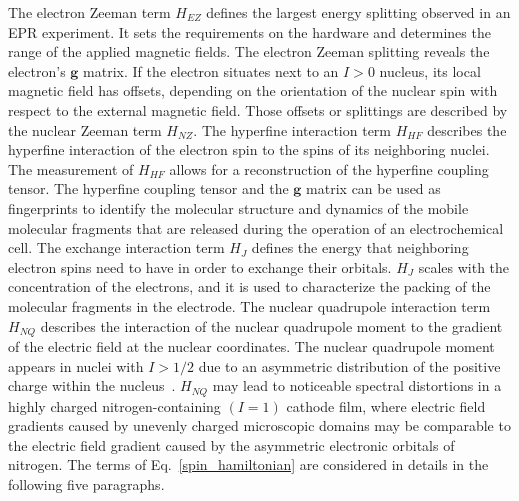 The electron Zeeman term $H_{EZ}$ defines the largest energy splitting observed in an EPR experiment. It sets the requirements on the hardware and determines the range of the applied magnetic fields. The electron Zeeman splitting reveals the electron's $\textbf{g}$ matrix. If the electron situates next to an $I>0$ nucleus, its local magnetic field has offsets, depending on the orientation of the nuclear spin with respect to the external magnetic field. Those offsets or splittings are described by the nuclear Zeeman term $H_{NZ}$. The hyperfine interaction term $H_{HF}$ describes the hyperfine interaction of the electron spin to the spins of its neighboring nuclei. The measurement of $H_{HF}$ allows for a reconstruction of the hyperfine coupling tensor. The hyperfine coupling tensor and the $\textbf{g}$ matrix can be used as fingerprints to identify the molecular structure and dynamics of the mobile molecular fragments that are released during the operation of an electrochemical cell. The exchange interaction term $H_{J}$ defines the energy that neighboring electron spins need to have in order to exchange their orbitals. $H_{J}$ scales with the concentration of the electrons, and it is used to characterize the packing of the molecular fragments in the electrode. The nuclear quadrupole interaction term $H_{NQ}$ describes the interaction of the nuclear quadrupole moment to the gradient of the electric field at the nuclear coordinates. The nuclear quadrupole moment appears in nuclei with $I>1/2$ due to an asymmetric distribution of the positive charge within the nucleus~\cite{Schweiger2001}. $H_{NQ}$ may lead to noticeable spectral distortions in a highly charged nitrogen-containing $(I=1)$ cathode film, where electric field gradients caused by unevenly charged microscopic domains may be comparable to the electric field gradient caused by the asymmetric electronic orbitals of nitrogen. The terms of Eq.~\ref{spin_hamiltonian} are considered in details in the following five paragraphs.

